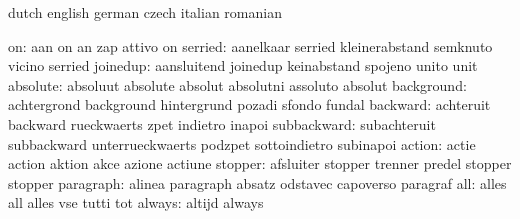 


\startvariables            dutch                     english
                           german                    czech
                           italian                   romanian

                       on: aan                       on
                           an                        zap
                           attivo                    on
                  serried: aanelkaar                 serried
                           kleinerabstand            semknuto
                           vicino                    serried
                 joinedup: aansluitend               joinedup
                           keinabstand               spojeno
                           unito                     unit
                 absolute: absoluut                  absolute
                           absolut                   absolutni
                           assoluto                  absolut
               background: achtergrond               background
                           hintergrund               pozadi
                           sfondo                    fundal
                 backward: achteruit                 backward
                           rueckwaerts               zpet
                           indietro                  inapoi
              subbackward: subachteruit              subbackward
                           unterrueckwaerts          podzpet
                           sottoindietro             subinapoi
                   action: actie                     action
                           aktion                    akce
                           azione                    actiune
                  stopper: afsluiter                 stopper
                           trenner                   predel
                           stopper                   stopper
                paragraph: alinea                    paragraph
                           absatz                    odstavec
                           capoverso                 paragraf
                      all: alles                     all
                           alles                     vse
                           tutti                     tot
                   always: altijd                    always

